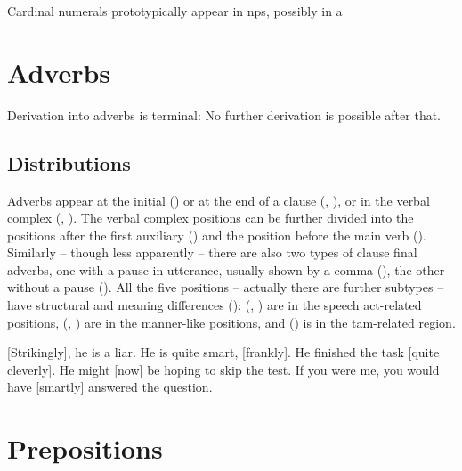 \documentclass[UTF8, a4paper, oneside, scheme=plain, 12pt]{ctexbook}
\begin{document}
Cardinal numerals prototypically appear in \acs{np}s,
possibly in a 

\section{Adverbs}\label{sec:pos.adverb}

Derivation into adverbs is terminal:
No further derivation is possible after that.

\subsection{Distributions}

Adverbs appear at the initial () or
at the end of a clause (, ), 
or in the verbal complex (, ).
The verbal complex positions can be further divided into 
the positions after the first auxiliary ()
and the position before the main verb ().
Similarly -- though less apparently -- 
there are also two types of clause final adverbs,
one with a pause in utterance, usually shown by a comma (),
the other without a pause ().
All the five positions -- actually there are further subtypes -- have structural and meaning differences
():
(, ) 
are in the speech act-related positions,
(, ) 
are in the manner-like positions,
and () 
is in the \acs{tam}-related region.

\begin{exe}
    \ex\label{ex:overview.adverb-1} [Strikingly], he is a liar.
    \ex\label{ex:overview.adverb-2} He is quite smart, [frankly].
    \ex\label{ex:overview.adverb-5} He finished the task [quite cleverly].
    \ex\label{ex:overview.adverb-3} He might [now] be hoping to skip the test.
    \ex\label{ex:overview.adverb-4} If you were me, you would have [smartly] answered the question.
\end{exe}

\section{Prepositions}\label{sec:pos.prep}
\end{document}
